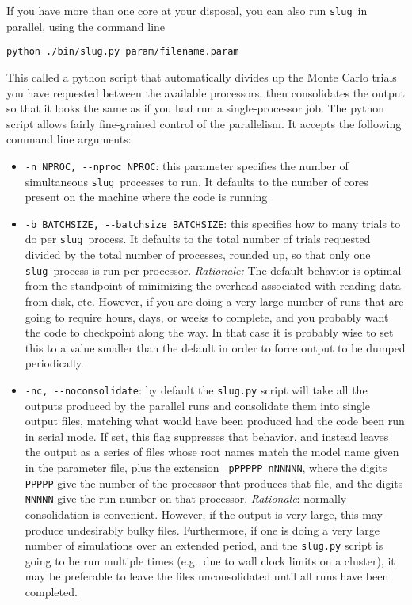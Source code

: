 \documentclass[12pt]{article}
\newcommand{\slug}{\texttt{slug}}
\begin{document}
If you have more than one core at your disposal, you can also run \slug\ in parallel, using the command line
\begin{verbatim}
python ./bin/slug.py param/filename.param
\end{verbatim}
This called a python script that automatically divides up the Monte Carlo trials you have requested between the available processors, then consolidates the output so that it looks the same as if you had run a single-processor job. The python script allows fairly fine-grained control of the parallelism. It accepts the following command line arguments:
\begin{itemize}
\item \verb=-n NPROC, --nproc NPROC=: this parameter specifies the number of simultaneous \slug\ processes to run. It defaults to the number of cores present on the machine where the code is running
\item \verb=-b BATCHSIZE, --batchsize BATCHSIZE=: this specifies how to many trials to do per \slug\ process. It defaults to the total number of trials requested divided by the total number of processes, rounded up, so that only one \slug\ process is run per processor. \textit{Rationale:} The default behavior is optimal from the standpoint of minimizing the overhead associated with reading data from disk, etc. However, if you are doing a very large number of runs that are going to require hours, days, or weeks to complete, and you probably want the code to checkpoint along the way. In that case it is probably wise to set this to a value smaller than the default in order to force output to be dumped periodically.
\item \verb=-nc, --noconsolidate=: by default the \verb=slug.py= script will take all the outputs produced by the parallel runs and consolidate them into single output files, matching what would have been produced had the code been run in serial mode. If set, this flag suppresses that behavior, and instead leaves the output as a series of files whose root names match the model name given in the parameter file, plus the extension \verb=_pPPPPP_nNNNNN=, where the digits \verb=PPPPP= give the number of the processor that produces that file, and the digits \verb=NNNNN= give the run number on that processor. \textit{Rationale}: normally consolidation is convenient. However, if the output is very large, this may produce undesirably bulky files. Furthermore, if one is doing a very large number of simulations over an extended period, and the \verb=slug.py= script is going to be run multiple times (e.g.\ due to wall clock limits on a cluster), it may be preferable to leave the files unconsolidated until all runs have been completed.
\end{itemize}
\end{document}
